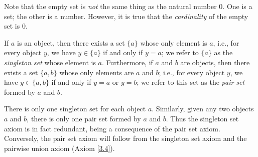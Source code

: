 \begin{remark}\label{3.1.8}
    Note that the empty set is \emph{not} the same thing as the natural number \(0\).
    One is a set;
    the other is a number.
    However, it is true that the \emph{cardinality} of the empty set is \(0\).
\end{remark}

\begin{axiom}\label{3.3}
    If \(a\) is an object, then there exists a set \(\{a\}\) whose only element is \(a\), i.e., for every object \(y\), we have \(y \in \{a\}\) if and only if \(y = a\);
    we refer to \(\{a\}\) as the \emph{singleton set} whose element is \(a\).
    Furthermore, if \(a\) and \(b\) are objects, then there exists a set \(\{a, b\}\) whose only elements are \(a\) and \(b\);
    i.e., for every object \(y\), we have \(y \in \{a, b\}\) if and only if \(y = a\) or \(y = b\);
    we refer to this set as the \emph{pair set} formed by \(a\) and \(b\).
\end{axiom}

\begin{remark}\label{3.1.9}
    There is only one singleton set for each object \(a\).
    Similarly, given any two objects \(a\) and \(b\), there is only one pair set formed by \(a\) and \(b\).
    Thus the singleton set axiom is in fact redundant, being a consequence of the pair set axiom.
    Conversely, the pair set axiom will follow from the singleton set axiom and the pairwise union axiom (Axiom \ref{3.4}).
\end{remark}


